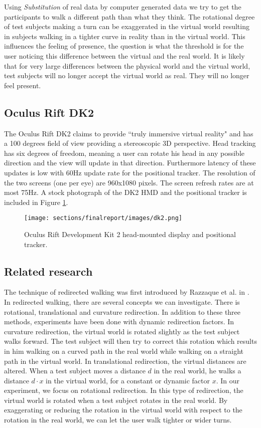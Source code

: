 Using \textit{Substitution} of real data by computer generated data we try to get the participants to walk a different path than what they think. 
The rotational degree of test subjects making a turn can be exaggerated in the virtual world resulting in subjects walking in a tighter curve in reality than in the virtual world.
This influences the feeling of presence, the question is what the threshold is for the user noticing this difference between the virtual and the real world. 
It is likely that for very large differences between the physical world and the virtual world, test subjects will no longer accept the virtual world as real.
They will no longer feel present. 


\subsection{Oculus Rift DK2}
The Oculus Rift DK2 claims to provide ``truly immersive virtual reality" and has a 100 degrees field of view providing a stereoscopic 3D perspective.\cite{oculus}
Head tracking has six degrees of freedom, meaning a user can rotate his head in any possible direction and the view will update in that direction.
Furthermore latency of these updates is low with 60Hz update rate for the positional tracker.
The resolution of the two screens (one per eye) are 960x1080 pixels.
The screen refresh rates are at most 75Hz.
A stock photograph of the DK2 HMD and the positional tracker is included in Figure  \ref{fig:dk2}.

\begin{figure}
	\centering
	\texttt{[image: sections/finalreport/images/dk2.png]}	
	\caption{Oculus Rift Development Kit 2 head-mounted display and positional tracker.}
	\label{fig:dk2}
\end{figure}

\subsection{Related  research}
The technique of redirected walking was first introduced by Razzaque et al. in \cite{razzaque}. 
In redirected walking, there are several concepts we can investigate.
There is rotational, translational and curvature redirection.
In addition to these three methods, experiments have been done with dynamic redirection factors.\cite{neth}
In curvature redirection, the virtual world is rotated slightly as the test subject walks forward.
The test subject will then try to correct this rotation which results in him walking on a curved path in the real world while walking on a straight path in the virtual world.
In translational redirection, the virtual distances are altered.
When a test subject moves a distance $d$ in the real world, he walks a distance $d\cdot x$ in the virtual world, for a constant or dynamic factor $x$.
In our experiment, we focus on rotational redirection.
In this type of redirection, the virtual world is rotated when a test subject rotates in the real world.
By exaggerating or reducing the rotation in the virtual world with respect to the rotation in the real world, we can let the user walk tighter or wider turns.

